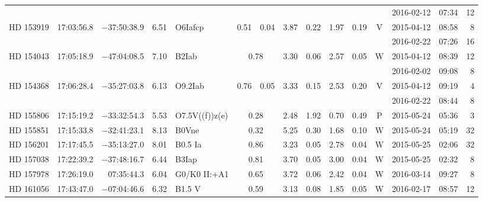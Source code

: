 \begin{tiny}
\begin{longtable}{lrrrll@{$\,\pm$\,}rl@{$\,\pm$\,}rl@{$\,\pm$\,}rcrrr}
              &          &               &            &                 & \multicolumn{6}{c}{}                              &       &2016-02-12 &07:34&   12\\  %
HD 153919     &17:03:56.8&  $-$37:50:38.9&        6.51&  O6Iafcp        & 0.51 & 0.04   &    3.87 & 0.22 &      1.97 & 0.19 &    V  &2015-04-12 &08:58&    8\\  %
              &          &               &            &                 & \multicolumn{6}{c}{}                              &       &2016-02-22 &07:26&   16\\  %
HD 154043     &17:05:18.9&  $-$47:04:08.5&        7.10&  B2Iab          &\multicolumn{2}{c}{0.78}&3.30 & 0.06 & 2.57 & 0.05 &    W  &2015-04-12 &08:39&   12\\  %
              &          &               &            &                 & \multicolumn{6}{c}{}                              &       &2016-02-02 &09:08&    8\\%
HD 154368     &17:06:28.4&  $-$35:27:03.8&        6.13&  O9.2Iab        & 0.76 & 0.05   &    3.33 & 0.15 &      2.53 & 0.20 &    V  &2015-04-12 &09:19&    4\\%
              &          &               &            &                 & \multicolumn{6}{c}{}                              &       &2016-02-22 &08:44&    8\\%
HD 155806     &17:15:19.2&  $-$33:32:54.3&        5.53&  O7.5V((f))z(e) &\multicolumn{2}{c}{0.28}&2.48 & 1.92 & 0.70 & 0.49 &    P  &2015-05-24 &05:36&    3\\%
HD 155851     &17:15:33.8&  $-$32:41:23.1&        8.13&  B0Vne &\multicolumn{2}{c}{0.32}&    5.25 & 0.30 & 1.68 & 0.10 &    W  &2015-05-24 &05:19&   32\\  %
HD 156201     &17:17:45.5&  $-$35:13:27.0&        8.01&  B0.5 Ia&\multicolumn{2}{c}{0.86}&   3.23 & 0.05 & 2.78 & 0.04 &    W  &2015-05-25 &02:06&   32\\  %
HD 157038     &17:22:39.2&  $-$37:48:16.7&        6.44&  B3Iap  &\multicolumn{2}{c}{0.81}&   3.70 & 0.05 & 3.00 & 0.04 &    W  &2015-05-25 &02:32&    8\\  %
HD 157978     &17:26:19.0&     07:35:44.3&        6.04&  G0/K0 II:+A1   &\multicolumn{2}{c}{0.65}&3.72 & 0.06 & 2.42 & 0.04 &    W  &2016-03-14 &09:27&    8\\  %
HD 161056     &17:43:47.0&  $-$07:04:46.6&        6.32&  B1.5 V  &\multicolumn{2}{c}{0.59}&  3.13 & 0.08 & 1.85 & 0.05 &    W  &2016-02-17 &08:57&   12\\  %

\end{longtable}
\end{tiny}
